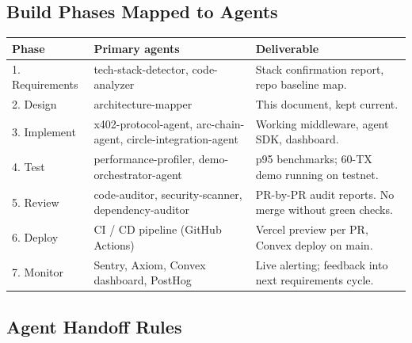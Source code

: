 \documentclass[11pt,a4paper]{article}
\begin{document}
\begin{center}
\end{center}

\subsection{Build Phases Mapped to Agents}

\begin{table}[H]
\centering
\footnotesize
\begin{tabularx}{\textwidth}{@{} l X X @{}}
\toprule
\textbf{Phase} & \textbf{Primary agents} & \textbf{Deliverable} \\
\midrule
1. Requirements & tech-stack-detector, code-analyzer & Stack confirmation report, repo baseline map. \\
2. Design & architecture-mapper & This document, kept current. \\
3. Implement & x402-protocol-agent, arc-chain-agent, circle-integration-agent & Working middleware, agent SDK, dashboard. \\
4. Test & performance-profiler, demo-orchestrator-agent & p95 benchmarks; 60-TX demo running on testnet. \\
5. Review & code-auditor, security-scanner, dependency-auditor & PR-by-PR audit reports. No merge without green checks. \\
6. Deploy & CI / CD pipeline (GitHub Actions) & Vercel preview per PR, Convex deploy on main. \\
7. Monitor & Sentry, Axiom, Convex dashboard, PostHog & Live alerting; feedback into next requirements cycle. \\
\bottomrule
\end{tabularx}
\end{table}

\subsection{Agent Handoff Rules}
\end{document}
